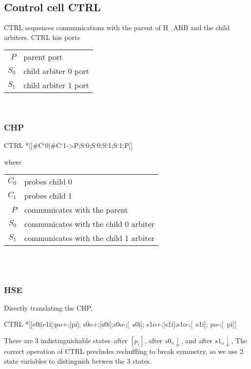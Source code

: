 \documentclass[aer.tex]{subfiles}
\begin{document}
\subsection{Control cell CTRL}
CTRL sequences communications with the parent of H\_ARB and the child arbiters.
CTRL has ports

\begin{tabular}[]{rl}
$P$ & parent port \\
$S_0$ & child arbiter 0 port \\
$S_1$ & child arbiter 1 port \\
\end{tabular} \\

\subsubsection*{CHP}

\begin{csp}
CTRL\equiv
  *[[#{C`0}|#{C`1}->P;S`0;S`0;S`1;S`1;P]]
\end{csp}

\noindent where 

\begin{tabular}[]{rl}
  $C_0$ & probes child 0 \\
  $C_1$ & probes child 1 \\
  $P$ & communicates with the parent \\
  $S_0$ & communicates with the child 0 arbiter \\
  $S_1$ & communicates with the child 1 arbiter \\
\end{tabular} \\ \\

\subsubsection*{HSE}

\noindent Directly translating the CHP,

\begin{hse}
CTRL\equiv
  *[[c0i|c1i];po+;[pi];
    s0o+;[s0i];s0o-;[~s0i];
    s1o+;[s1i];s1o-;[~s1i];
    po-;[~pi]]
\end{hse}

\noindent There are 3 indistinguishable states--after $[p_i]$, after $s0_o\!\downarrow$, and after $s1_o\!\downarrow$. The correct operation of CTRL precludes reshuffling to break symmetry, so we use 2 state variables to distinguish betwen the 3 states.
\end{document}

